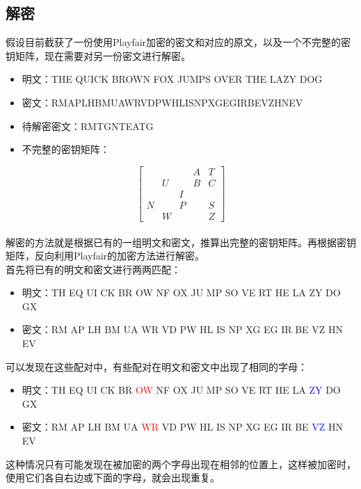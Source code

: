 \subsection{解密}

假设目前截获了一份使用Playfair加密的密文和对应的原文，以及一个不完整的密钥矩阵，现在需要对另一份密文进行解密。

\begin{itemize}
    \item 明文：THE QUICK BROWN FOX JUMPS OVER THE LAZY DOG
    \item 密文：RMAPLHBMUAWRVDPWHLISNPXGEGIRBEVZHNEV
    \item 待解密密文：RMTGNTEATG
    \item 不完整的密钥矩阵：
\end{itemize}

\[
    \begin{bmatrix}
          &   &   & A & T \\
          & U &   & B & C \\
          &   & I &   &   \\
        N &   & P &   & S \\
          & W &   &   & Z
    \end{bmatrix}
\]\\

解密的方法就是根据已有的一组明文和密文，推算出完整的密钥矩阵。再根据密钥矩阵，反向利用Playfair的加密方法进行解密。\\

首先将已有的明文和密文进行两两匹配：

\begin{itemize}
    \item 明文：TH EQ UI CK BR OW NF OX JU MP SO VE RT HE LA ZY DO GX
    \item 密文：RM AP LH BM UA WR VD PW HL IS NP XG EG IR BE VZ HN EV
\end{itemize}

可以发现在这些配对中，有些配对在明文和密文中出现了相同的字母：

\begin{itemize}
    \item 明文：TH EQ UI CK BR \textcolor{red}{OW} NF OX JU MP SO VE RT HE LA \textcolor{blue}{ZY} DO GX
    \item 密文：RM AP LH BM UA \textcolor{red}{WR} VD PW HL IS NP XG EG IR BE \textcolor{blue}{VZ} HN EV
\end{itemize}

这种情况只有可能发现在被加密的两个字母出现在相邻的位置上，这样被加密时，使用它们各自右边或下面的字母，就会出现重复。\\

